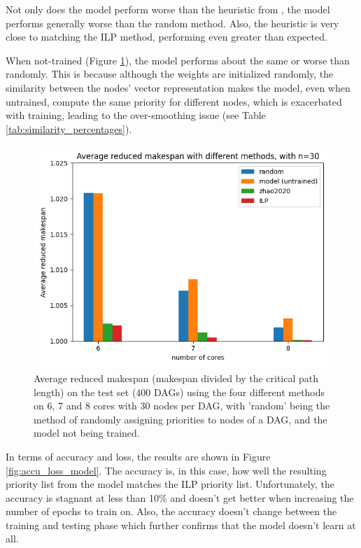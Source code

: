 Not only does the model perform worse than the heuristic from \citet{zhao2020DAGsched},
the model performs generally worse than the random method.
Also, the heuristic is very close to matching the ILP method,
performing even greater than expected.

When not-trained (Figure \ref{fig:avg_makespan_comparison_untrained}), the model performs 
about the same or worse than randomly.
This is because although the weights are initialized randomly,
the similarity between the nodes' vector representation
makes the model, even when untrained, 
compute the same priority for different nodes, which 
is exacerbated with training, leading to the over-smoothing
issue (see Table \ref{tab:similarity_percentages}).


\begin{figure}
    \centering
    \includegraphics[width=\linewidth]{images/avg_makespan_n30_untrained.png}
    \caption{Average reduced makespan (makespan divided by the critical path length) on the test set (400 DAGs) using the four different methods
    on 6, 7 and 8 cores with 30 nodes per DAG,
    with 'random' being the method of randomly assigning priorities to nodes of a DAG,
    and the model not being trained.}
    \label{fig:avg_makespan_comparison_untrained}
\end{figure}


In terms of accuracy and loss, the results are shown in Figure \ref{fig:accu_loss_model}.
The accuracy is, in this case, how well the resulting priority list 
from the model matches the ILP priority list.
Unfortunately, the accuracy is stagnant at less than 10\%
and doesn't get better when increasing the number of epochs to train on. 
Also, the accuracy doesn't change between the training and testing phase
which further confirms that the model doesn't learn at all.

